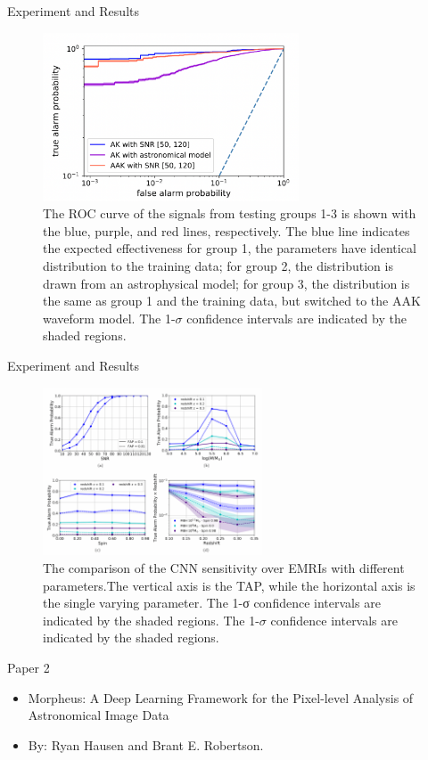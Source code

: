 \documentclass[aspectratio=1610,xcolor={dvipsnames},hyperref={colorlinks,unicode,linkcolor=violet,anchorcolor=blueviolet,citecolor=YellowOrange,filecolor=black,urlcolor=Aquamarine}]{beamer}
\begin{document}
\begin{frame}[label={sec:orgcfa1932}]{Experiment and Results}
\begin{figure}[htbp]
\centering
\includegraphics[height=5cm]{./p7.png}
\caption{The ROC curve of the signals from testing groups 1-3 is shown with the blue, purple, and red lines, respectively. The blue line indicates the expected effectiveness for group 1, the parameters have identical distribution to the training data; for group 2, the distribution is drawn from an astrophysical model; for group 3, the distribution is the same as group 1 and the training data, but switched to the AAK waveform model. The 1-\(\sigma\) confidence intervals are indicated by the shaded regions.}
\end{figure}
\end{frame}

\begin{frame}[label={sec:orgbe48363}]{Experiment and Results}
\begin{figure}[htbp]
\centering
\includegraphics[height=5cm]{./p8.png}
\caption{The comparison of the CNN sensitivity over EMRIs with different parameters.The vertical axis is the TAP, while the horizontal axis is the single varying parameter. The 1-σ confidence intervals are indicated by the shaded regions. The 1-\(\sigma\) confidence intervals are indicated by the shaded regions.}
\end{figure}
\end{frame}

\begin{frame}[label={sec:orge91f678}]{Paper 2}
\begin{itemize}
\item Morpheus: A Deep Learning Framework for the Pixel-level Analysis of
Astronomical Image Data \autocite{hausenMorpheusDeepLearning2020}
\item By: Ryan Hausen and Brant E. Robertson.
\end{itemize}
\end{frame}
\end{document}
